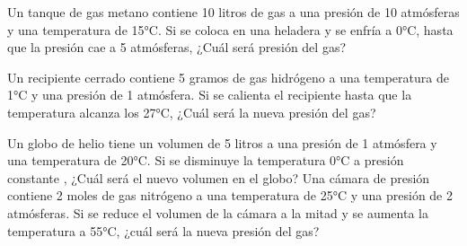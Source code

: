 \documentclass[./examen.tex]{subfiles}
\begin{document}
\begin{center}
\end{center}
\begin{questions}

 \question Un tanque de gas metano contiene 10 litros de gas a una presión de 10 atmósferas y una temperatura de 15°C. Si se coloca en una heladera y se enfría a 0°C, hasta que la presión cae a 5 atmósferas, ¿Cuál será presión del gas?

\question Un recipiente cerrado contiene 5 gramos de gas hidrógeno a una temperatura de 1°C y una presión de 1 atmósfera. Si se calienta el recipiente hasta que la temperatura alcanza los 27°C, ¿Cuál será la nueva presión del gas?

 \question Un globo de helio tiene un volumen de 5 litros a una presión de 1 atmósfera y una temperatura de 20°C. Si se disminuye la temperatura 0°C a presión constante , ¿Cuál será el nuevo volumen en el globo?
\question Una cámara de presión contiene 2 moles de gas nitrógeno a una temperatura de 25°C y una presión de 2 atmósferas. Si se reduce el volumen de la cámara a la mitad y se aumenta la temperatura a 55°C, ¿cuál será la nueva presión del gas?

\end{questions}
\end{document}
